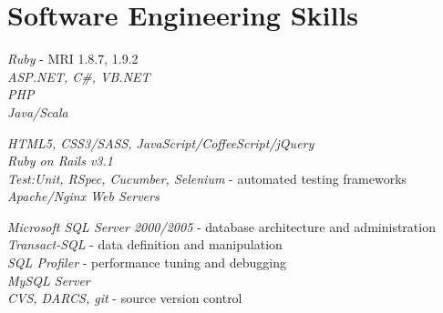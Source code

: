

\section{Software Engineering Skills}

{
	\textit{Ruby} - MRI 1.8.7, 1.9.2\\
	\textit{ASP.NET, C\#, VB.NET}\\
	\textit{PHP}\\
	\textit{Java/Scala}
}


{
	\textit{HTML5, CSS3/SASS, JavaScript/CoffeeScript/jQuery}\\
	\textit{Ruby on Rails v3.1}\\
	\textit{Test:Unit, RSpec, Cucumber, Selenium} - automated testing frameworks\\
	\textit{Apache/Nginx Web Servers}\\
}


{
	\textit{Microsoft SQL Server 2000/2005} - database architecture and administration\\
	\textit{Transact-SQL} - data definition and manipulation\\
	\textit{SQL Profiler} - performance tuning and debugging\\
	\textit{MySQL Server}\\
	\textit{CVS, DARCS, git} - source version control
} 
